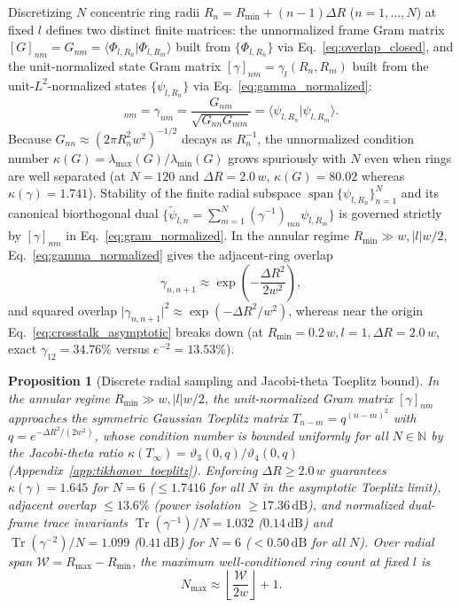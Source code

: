 \documentclass[aps,pra,reprint,nofootinbib,floatfix,longbibliography]{revtex4-2}
\newtheorem{proposition}{Proposition}
\theoremstyle{remark}
\newcommand{\braket}[2]{\langle #1 | #2 \rangle}
\newcommand{\abs}[1]{\lvert #1 \rvert}
\begin{document}
Discretizing $N$ concentric ring radii $R_n = R_{\min} + (n-1)\Delta R$ ($n = 1,\dots,N$) at fixed $l$ defines two distinct finite matrices: the unnormalized frame Gram matrix $[G]_{nm} = G_{nm} = \braket{\Phi_{l,R_n}}{\Phi_{l,R_m}}$ built from $\{\Phi_{l,R_n}\}$ via Eq.~\eqref{eq:overlap_closed}, and the unit-normalized state Gram matrix $[\gamma]_{nm} = \gamma_l(R_n,R_m)$ built from the unit-$L^2$-normalized states $\{\psi_{l,R_n}\}$ via Eq.~\eqref{eq:gamma_normalized}:
\begin{equation}
[\gamma]_{nm} = \gamma_{nm} = \frac{G_{nm}}{\sqrt{G_{nn} G_{mm}}} = \braket{\psi_{l,R_n}}{\psi_{l,R_m}}.
\label{eq:gram_normalized}
\end{equation}
Because $G_{nn} \approx (2\pi R_n^2 w^2)^{-1/2}$ decays as $R_n^{-1}$, the unnormalized condition number $\kappa(G) = \lambda_{\max}(G)/\lambda_{\min}(G)$ grows spuriously with $N$ even when rings are well separated (at $N = 120$ and $\Delta R = 2.0\,w$, $\kappa(G) = 80.02$ whereas $\kappa(\gamma) = 1.741$). Stability of the finite radial subspace $\operatorname{span}\{\psi_{l,R_n}\}_{n=1}^N$ and its canonical biorthogonal dual $\{\tilde{\psi}_{l,n} = \sum_{m=1}^N (\gamma^{-1})_{mn}\psi_{l,R_m}\}$ is governed strictly by $[\gamma]_{nm}$ in Eq.~\eqref{eq:gram_normalized}. In the annular regime $R_{\min} \gg w, \abs{l}w/2$, Eq.~\eqref{eq:gamma_normalized} gives the adjacent-ring overlap
\begin{equation}
\gamma_{n,n+1} \approx \exp\!\left(-\frac{\Delta R^2}{2w^2}\right),
\label{eq:crosstalk_asymptotic}
\end{equation}
and squared overlap $\abs{\gamma_{n,n+1}}^2 \approx \exp(-\Delta R^2/w^2)$, whereas near the origin Eq.~\eqref{eq:crosstalk_asymptotic} breaks down (at $R_{\min} = 0.2\,w, l = 1, \Delta R = 2.0\,w$, exact $\gamma_{12} = 34.76\%$ versus $e^{-2} = 13.53\%$).

\begin{proposition}[Discrete radial sampling and Jacobi-theta Toeplitz bound]
\label{prop:channel_capacity}
In the annular regime $R_{\min} \gg w, \abs{l}w/2$, the unit-normalized Gram matrix $[\gamma]_{nm}$ approaches the symmetric Gaussian Toeplitz matrix $T_{n-m} = q^{(n-m)^2}$ with $q = e^{-\Delta R^2/(2w^2)}$, whose condition number is bounded uniformly for all $N \in \mathbb{N}$ by the Jacobi-theta ratio $\kappa(T_\infty) = \vartheta_3(0,q)/\vartheta_4(0,q)$ (Appendix~\ref{app:tikhonov_toeplitz}). Enforcing $\Delta R \ge 2.0\,w$ guarantees $\kappa(\gamma) = 1.645$ for $N = 6$ ($\le 1.7416$ for all $N$ in the asymptotic Toeplitz limit), adjacent overlap $\le 13.6\%$ (power isolation $\ge 17.36\,\mathrm{dB}$), and normalized dual-frame trace invariants $\operatorname{Tr}(\gamma^{-1})/N = 1.032$ ($0.14\,\mathrm{dB}$) and $\operatorname{Tr}(\gamma^{-2})/N = 1.099$ ($0.41\,\mathrm{dB}$) for $N = 6$ ($< 0.50\,\mathrm{dB}$ for all $N$). Over radial span $\mathcal{W} = R_{\max} - R_{\min}$, the maximum well-conditioned ring count at fixed $l$ is
\begin{equation}
N_{\max} \approx \left\lfloor \frac{\mathcal{W}}{2w} \right\rfloor + 1.
\label{eq:channel_capacity}
\end{equation}
\end{proposition}
\end{document}
